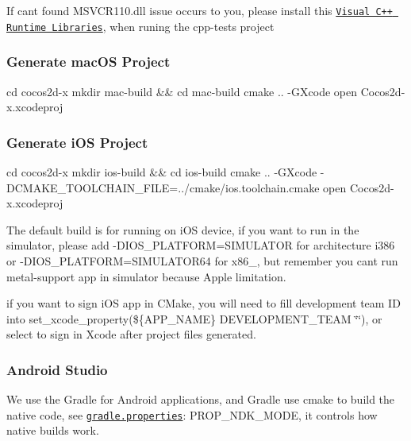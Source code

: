 If can\textquotesingle{}t found {\ttfamily M\+S\+V\+C\+R110.\+dll} issue occurs to you, please install this \href{https://www.microsoft.com/en-us/download/details.aspx?id=30679}{\tt Visual C++ Runtime Libraries}, when runing the cpp-\/tests project

\subsubsection*{Generate mac\+OS Project}


\begin{DoxyCode}
cd cocos2d-x
mkdir mac-build && cd mac-build
cmake .. -GXcode
open Cocos2d-x.xcodeproj
\end{DoxyCode}


\subsubsection*{Generate i\+OS Project}


\begin{DoxyCode}
cd cocos2d-x
mkdir ios-build && cd ios-build
cmake .. -GXcode -DCMAKE\_TOOLCHAIN\_FILE=../cmake/ios.toolchain.cmake
open Cocos2d-x.xcodeproj
\end{DoxyCode}


The default build is for running on i\+OS device, if you want to run in the simulator, please add {\ttfamily -\/\+D\+I\+O\+S\+\_\+\+P\+L\+A\+T\+F\+O\+RM=S\+I\+M\+U\+L\+A\+T\+OR} for architecture i386 or {\ttfamily -\/\+D\+I\+O\+S\+\_\+\+P\+L\+A\+T\+F\+O\+RM=S\+I\+M\+U\+L\+A\+T\+O\+R64} for x86\+\_, but remember you can\textquotesingle{}t run metal-\/support app in simulator because Apple limitation.

if you want to sign i\+OS app in C\+Make, you will need to fill development team ID into {\ttfamily set\+\_\+xcode\+\_\+property(\$\{A\+P\+P\+\_\+\+N\+A\+ME\} D\+E\+V\+E\+L\+O\+P\+M\+E\+N\+T\+\_\+\+T\+E\+AM \char`\"{}\char`\"{})}, or select to sign in Xcode after project files generated.

\subsubsection*{Android Studio}

We use the Gradle for Android applications, and Gradle use cmake to build the native code, see \href{https://github.com/cocos2d/cocos2d-x/blob/84be684e3858393a6f3efc50e3f95d4e0ac92a20/tests/cpp-empty-test/proj.android/gradle.properties#L38}{\tt gradle.\+properties}\+: {\ttfamily P\+R\+O\+P\+\_\+\+N\+D\+K\+\_\+\+M\+O\+DE}, it controls how native builds work.



